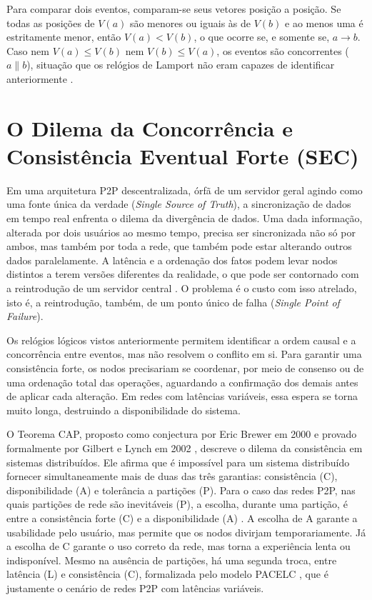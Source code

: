 Para comparar dois eventos, comparam-se seus vetores posição a posição. Se todas as posições de $V(a)$ são menores ou iguais
às de $V(b)$ e ao menos uma é estritamente menor, então $V(a) < V(b)$, o que ocorre se, e somente se, $a \rightarrow b$.
Caso nem $V(a) \leq V(b)$ nem $V(b) \leq V(a)$, os eventos são concorrentes ($a \parallel b$), situação que os relógios
de Lamport não eram capazes de identificar anteriormente \cite{mattern1989}.

\section{O Dilema da Concorrência e Consistência Eventual Forte (SEC)}

Em uma arquitetura P2P descentralizada, órfã de um servidor geral agindo
como uma fonte única da verdade (\textit{Single Source of Truth}), a sincronização
de dados em tempo real enfrenta o dilema da divergência de dados. Uma dada
informação, alterada por dois usuários ao mesmo tempo, precisa ser
sincronizada não só por ambos, mas também por toda a rede, que também pode
estar alterando outros dados paralelamente. A latência e a ordenação dos
fatos podem levar nodos distintos a terem versões diferentes da realidade,
o que pode ser contornado com a reintrodução de um servidor central
\cite{tanenbaumvansteen2007}. O problema é o custo com isso
atrelado, isto é, a reintrodução, também, de um ponto único de falha
(\textit{Single Point of Failure}).

Os relógios lógicos vistos anteriormente permitem identificar a ordem causal e a concorrência entre eventos, mas não resolvem
o conflito em si. Para garantir uma consistência forte, os nodos precisariam se coordenar, por meio de consenso ou de uma
ordenação total das operações, aguardando a confirmação dos demais antes de aplicar cada alteração. Em redes com latências
variáveis, essa espera se torna muito longa, destruindo a disponibilidade do sistema.

O Teorema CAP, proposto como conjectura por Eric Brewer em 2000 \cite{brewer2000} e provado formalmente por Gilbert e
Lynch em 2002 \cite{gilbertlynch2002}, descreve o dilema da
consistência em sistemas distribuídos. Ele afirma que é impossível para um sistema distribuído fornecer
simultaneamente mais de duas das três garantias: consistência (C), disponibilidade (A) e tolerância a partições (P).
Para o caso das redes P2P, nas quais partições de rede são inevitáveis (P), a escolha, durante uma partição, é entre a consistência
forte (C) e a disponibilidade (A) \cite{brewer2012}. A escolha de A garante a usabilidade pelo usuário, mas permite que os nodos
divirjam temporariamente. Já a escolha de C garante o uso correto da rede, mas torna a experiência lenta
ou indisponível. Mesmo na ausência de partições, há uma segunda troca, entre latência (L) e consistência (C), formalizada
pelo modelo PACELC \cite{abadi2012}, que é justamente o cenário de redes P2P com latências variáveis.

